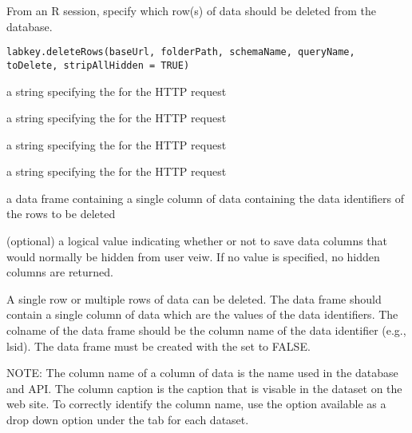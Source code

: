 \documentclass{article}
\begin{document}
\begin{Description}\relax
From an R session, specify which row(s) of data should be deleted from the database.
\end{Description}
\begin{Usage}
\begin{verbatim}
labkey.deleteRows(baseUrl, folderPath, schemaName, queryName, toDelete, stripAllHidden = TRUE)
\end{verbatim}
\end{Usage}
\begin{Arguments}
\begin{ldescription}
\item[\code{baseUrl}] a string specifying the for the HTTP request
\item[\code{folderPath}] a string specifying the  for the HTTP request
\item[\code{schemaName}] a string specifying the   for the HTTP request
\item[\code{queryName}] a string specifying the   for the HTTP request
\item[\code{toDelete}] a data frame containing a single column of data containing the data identifiers of the rows to be deleted
\item[\code{stripAllHidden}] (optional) a logical value indicating whether or not to save data columns that would 
normally be hidden from user veiw. If no value is specified, no hidden columns are returned.
\end{ldescription}
\end{Arguments}
\begin{Details}\relax
A single row or multiple rows of data can be deleted.  The  data frame should contain a single column of data which are the values of the data identifiers.  The colname of the data frame should
be the column name of the data identifier (e.g., lsid). The data frame must be created with the 
set to FALSE.

NOTE: The column name of a column of data is the name used in the database and API. The column caption is the 
caption that is visable in the dataset on the web site. To correctly identify the column name, use the 
 option available as a drop down option under the  tab for each dataset.
\end{Details}
\end{document}
